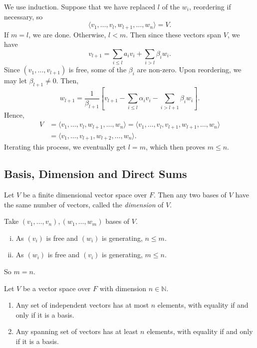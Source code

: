 \documentclass[12pt]{article}
\begin{document}
\begin{proofbox}
	We use induction. Suppose that we have replaced $l$ of the $w_i$, reordering if necessary, so
\[
	\langle v_1, \ldots, v_{l}, w_{l+1}, \ldots, w_n \rangle = V
.\]
If $m = l$, we are done. Otherwise, $l < m$. Then since these vectors span $V$, we have
\[
v_{l+1} = \sum_{i \leq l}a_i v_i + \sum_{i > l}\beta_i w_i
.\]
	Since $(v_1, \ldots, v_{l+1})$ is free, some of the $\beta_i$ are non-zero. Upon reordering, we may let $\beta_{l+1} \neq 0$. Then,
\[
	w_{l+1} = \frac{1}{\beta_{l+1}} \left[ v_{l+1} - \sum_{i \leq l}\alpha_i v_i - \sum_{i > l+1} \beta_i w_i \right]
.\]
Hence, 
\begin{align*}
	V &= \langle v_1, \ldots, v_l, w_{l+1}, \ldots, w_n \rangle = \langle v_1, \ldots, v_l, v_{l+1}, w_{l+1}, \ldots, w_n \rangle \\
	  &= \langle v_1, \ldots, v_{l+1}, w_{l+2}, \ldots, w_n \rangle.
\end{align*}
Iterating this process, we eventually get $l = m$, which then proves $m \leq n$.
\end{proofbox}

\subsection{Basis, Dimension and Direct Sums}%
\label{sub:basis_dimension_and_direct_sums}

\begin{corollary}
	Let $V$ be a finite dimensional vector space over $F$. Then any two bases of $V$ have the same number of vectors, called the \textit{dimension} of $V$.
\end{corollary}

\begin{proofbox}
	Take $(v_1, \ldots, v_n), (w_1, \ldots, w_m)$ bases of $V$.
	\begin{enumerate}[(i)]
		\item As $(v_i)$ is free and $(w_i)$ is generating, $n \leq m$.
		\item As $(w_i)$ is free and $(v_i)$ is generating, $m \leq n.$
	\end{enumerate}
	So $m = n$.
\end{proofbox}

\begin{corollary}
	Let $V$ be a vector space over $F$ with dimension $n \in \mathbb{N}$.
	\begin{enumerate}[\normalfont(i)]
		\item Any set of independent vectors has at most $n$ elements, with equality if and only if it is a basis.
		\item Any spanning set of vectors has at least $n$ elements, with equality if and only if it is a basis.
	\end{enumerate}
	
\end{corollary}
\end{document}
